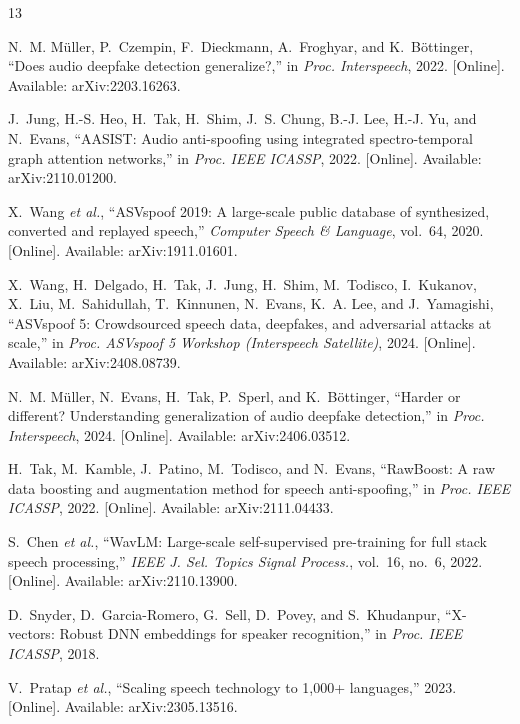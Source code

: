 \documentclass[conference]{IEEEtran}
\begin{document}
\begin{thebibliography}{13}

N.~M. M\"uller, P.~Czempin, F.~Dieckmann, A.~Froghyar, and K.~B\"ottinger,
  ``Does audio deepfake detection generalize?,'' in \emph{Proc.
  Interspeech}, 2022. [Online]. Available: arXiv:2203.16263.

J.~Jung, H.-S. Heo, H.~Tak, H.~Shim, J.~S. Chung, B.-J. Lee, H.-J. Yu,
  and N.~Evans, ``AASIST: Audio anti-spoofing using integrated
  spectro-temporal graph attention networks,'' in \emph{Proc. IEEE
  ICASSP}, 2022. [Online]. Available: arXiv:2110.01200.

X.~Wang \emph{et al.}, ``ASVspoof 2019: A large-scale public database of
  synthesized, converted and replayed speech,'' \emph{Computer Speech \&
  Language}, vol.~64, 2020. [Online]. Available: arXiv:1911.01601.

X.~Wang, H.~Delgado, H.~Tak, J.~Jung, H.~Shim, M.~Todisco, I.~Kukanov,
  X.~Liu, M.~Sahidullah, T.~Kinnunen, N.~Evans, K.~A. Lee, and
  J.~Yamagishi, ``ASVspoof 5: Crowdsourced speech data, deepfakes, and
  adversarial attacks at scale,'' in \emph{Proc. ASVspoof 5 Workshop
  (Interspeech Satellite)}, 2024. [Online]. Available: arXiv:2408.08739.

N.~M. M\"uller, N.~Evans, H.~Tak, P.~Sperl, and K.~B\"ottinger, ``Harder
  or different? Understanding generalization of audio deepfake
  detection,'' in \emph{Proc. Interspeech}, 2024. [Online]. Available:
  arXiv:2406.03512.

H.~Tak, M.~Kamble, J.~Patino, M.~Todisco, and N.~Evans, ``RawBoost: A
  raw data boosting and augmentation method for speech anti-spoofing,''
  in \emph{Proc. IEEE ICASSP}, 2022. [Online]. Available:
  arXiv:2111.04433.

S.~Chen \emph{et al.}, ``WavLM: Large-scale self-supervised pre-training
  for full stack speech processing,'' \emph{IEEE J. Sel. Topics Signal
  Process.}, vol.~16, no.~6, 2022. [Online]. Available: arXiv:2110.13900.

D.~Snyder, D.~Garcia-Romero, G.~Sell, D.~Povey, and S.~Khudanpur,
  ``X-vectors: Robust DNN embeddings for speaker recognition,'' in
  \emph{Proc. IEEE ICASSP}, 2018.

V.~Pratap \emph{et al.}, ``Scaling speech technology to 1,000+
  languages,'' 2023. [Online]. Available: arXiv:2305.13516.


\end{thebibliography}
\end{document}
